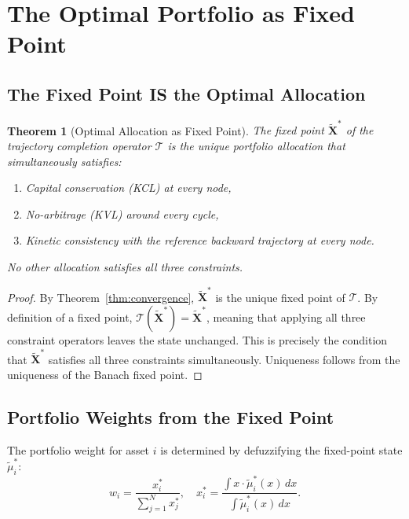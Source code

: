 \documentclass[twocolumn,10pt]{article}
\newtheorem{theorem}{Theorem}[section]
\theoremstyle{remark}
\newcommand{\fuzzy}[1]{\tilde{#1}}
\newcommand{\fuzzyset}[1]{\tilde{\mu}_{#1}}
\newcommand{\Tcomp}{\mathcal{T}}
\newcommand{\thmref}[1]{Theorem~\ref{#1}}
\begin{document}
\section{The Optimal Portfolio as Fixed Point}
\label{sec:optimal}

\subsection{The Fixed Point IS the Optimal Allocation}

\begin{theorem}[Optimal Allocation as Fixed Point]
\label{thm:optimal_fixed_point}
The fixed point $\fuzzy{\mathbf{X}}^*$ of the trajectory completion operator $\Tcomp$ is the unique portfolio allocation that simultaneously satisfies:
\begin{enumerate}[label=(\roman*)]
    \item Capital conservation (KCL) at every node,
    \item No-arbitrage (KVL) around every cycle,
    \item Kinetic consistency with the reference backward trajectory at every node.
\end{enumerate}
No other allocation satisfies all three constraints.
\end{theorem}

\begin{proof}
By \thmref{thm:convergence}, $\fuzzy{\mathbf{X}}^*$ is the unique fixed point of $\Tcomp$.  By definition of a fixed point, $\Tcomp(\fuzzy{\mathbf{X}}^*) = \fuzzy{\mathbf{X}}^*$, meaning that applying all three constraint operators leaves the state unchanged.  This is precisely the condition that $\fuzzy{\mathbf{X}}^*$ satisfies all three constraints simultaneously.  Uniqueness follows from the uniqueness of the Banach fixed point.
\end{proof}

\subsection{Portfolio Weights from the Fixed Point}

The portfolio weight for asset $i$ is determined by defuzzifying the fixed-point state $\fuzzyset{i}^*$:
\begin{equation}
    w_i = \frac{x_i^*}{\sum_{j=1}^N x_j^*}, \quad x_i^* = \frac{\int x \cdot \fuzzyset{i}^*(x) \, dx}{\int \fuzzyset{i}^*(x) \, dx}.
    \label{eq:portfolio_weights}
\end{equation}
\end{document}
